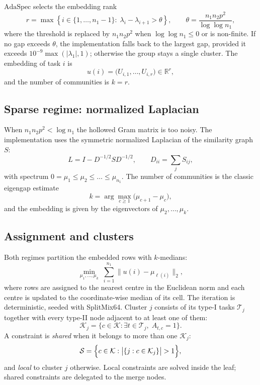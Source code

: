 \documentclass[11pt,a4paper]{article}
\newcommand{\RR}{\mathbb{R}}
\newcommand{\cK}{\mathcal{K}}
\newcommand{\cT}{\mathcal{T}}
\newcommand{\cS}{\mathcal{S}}
\begin{document}
$\mathrm{AdaSpec}$ selects the embedding rank
\begin{equation}
r=\max\left\{i\in\{1,\dots,n_1-1\}:\;
\lambda_i-\lambda_{i+1}>\theta\right\},
\qquad
\theta=\frac{n_1n_2p^2}{\log\log n_1},
\label{eq:adaspec-rank}
\end{equation}
where the threshold is replaced by $n_1n_2p^2$ when $\log\log n_1\le0$ or is
non-finite. If no gap exceeds $\theta$, the implementation falls back to the
largest gap, provided it exceeds $10^{-9}\max(|\lambda_1|,1)$; otherwise the
group stays a single cluster. The embedding of task $i$ is
\begin{equation}
u(i)=\bigl(U_{i,1},\dots,U_{i,r}\bigr)\in\RR^r,
\end{equation}
and the number of communities is $k=r$.

\subsection{Sparse regime: normalized Laplacian}
When $n_1n_2p^2<\log n_1$ the hollowed Gram matrix is too noisy. The
implementation uses the symmetric normalized Laplacian of the similarity graph
$S$:
\begin{equation}
L=I-D^{-1/2}SD^{-1/2},
\qquad
D_{ii}=\sum_{j}S_{ij},
\end{equation}
with spectrum $0=\mu_1\le\mu_2\le\dots\le\mu_{n_1}$. The number of communities
is the classic eigengap estimate
\begin{equation}
k=\arg\max_{c\ge1}\bigl(\mu_{c+1}-\mu_c\bigr),
\end{equation}
and the embedding is given by the eigenvectors of
$\mu_2,\dots,\mu_k$.

\subsection{Assignment and clusters}
Both regimes partition the embedded rows with $k$-medians:
\begin{equation}
\min_{\mu_1,\dots,\mu_k}\;\sum_{i=1}^{n_1}\bigl\|u(i)-\mu_{\ell(i)}\bigr\|_2,
\end{equation}
where rows are assigned to the nearest centre in the Euclidean norm and each
centre is updated to the coordinate-wise median of its cell. The iteration is
deterministic, seeded with SplitMix64. Cluster $j$ consists of its type-I
tasks $\cT_j$ together with every type-II node adjacent to at least one of
them:
\begin{equation}
\cK_j=\bigl\{c\in\cK:\exists t\in\cT_j,\;A_{t,c}=1\bigr\}.
\end{equation}
A constraint is \emph{shared} when it belongs to more than one $\cK_j$:
\begin{equation}
\cS=\Bigl\{c\in\cK:\bigl|\{j:c\in\cK_j\}\bigr|>1\Bigr\},
\end{equation}
and \emph{local} to cluster $j$ otherwise. Local constraints are solved inside
the leaf; shared constraints are delegated to the merge nodes.
\end{document}
